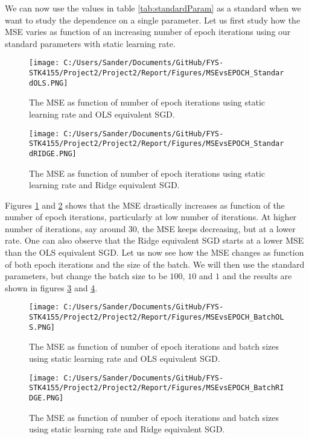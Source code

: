 \documentclass[12pt,a4paper]{article}
\begin{document}
\noindent We can now use the values in table \ref{tab:standardParam} as a standard when we want to study the dependence on a single parameter. Let us first study how the MSE varies as function of an increasing number of epoch iterations using our standard parameters with static learning rate.

\begin{figure}[H]
\centering
\texttt{[image: C:/Users/Sander/Documents/GitHub/FYS-STK4155/Project2/Project2/Report/Figures/MSEvsEPOCH\_StandardOLS.PNG]}
\caption{\label{fig:MSEvsEPOCHstandard} The MSE as function of number of epoch iterations using static learning rate and OLS equivalent SGD.}
\end{figure}

\begin{figure}[H]
\centering
\texttt{[image: C:/Users/Sander/Documents/GitHub/FYS-STK4155/Project2/Project2/Report/Figures/MSEvsEPOCH\_StandardRIDGE.PNG]}
\caption{\label{fig:MSEvsEPOCHstandardRidge} The MSE as function of number of epoch iterations using static learning rate and Ridge equivalent SGD.}
\end{figure}

\noindent Figures \ref{fig:MSEvsEPOCHstandard} and \ref{fig:MSEvsEPOCHstandardRidge} shows that the MSE drastically increases as function of the number of epoch iterations, particularly at low number of iterations. At higher number of iterations, say around 30, the MSE keeps decreasing, but at a lower rate. One can also observe that the Ridge equivalent SGD starts at a lower MSE than the OLS equivalent SGD. Let us now see how the MSE changes as function of both epoch iterations and the size of the batch. We will then use the standard parameters, but change the batch size to be $100$, $10$ and $1$ and the results are shown in figures \ref{fig:MSEvsEPOCHbatchOLS} and \ref{fig:MSEvsEPOCHbatchRIDGE}.

\begin{figure}[H]
\centering
\texttt{[image: C:/Users/Sander/Documents/GitHub/FYS-STK4155/Project2/Project2/Report/Figures/MSEvsEPOCH\_BatchOLS.PNG]}
\caption{\label{fig:MSEvsEPOCHbatchOLS} The MSE as function of number of epoch iterations and batch sizes using static learning rate and OLS equivalent SGD.}
\end{figure}

\begin{figure}[H]
\centering
\texttt{[image: C:/Users/Sander/Documents/GitHub/FYS-STK4155/Project2/Project2/Report/Figures/MSEvsEPOCH\_BatchRIDGE.PNG]}
\caption{\label{fig:MSEvsEPOCHbatchRIDGE} The MSE as function of number of epoch iterations and batch sizes using static learning rate and Ridge equivalent SGD.}
\end{figure}
\end{document}
